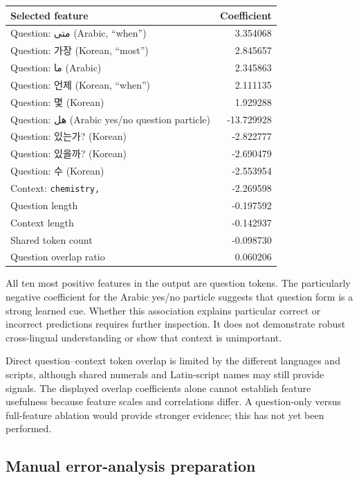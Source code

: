 \documentclass[11pt,a4paper]{article}
\newcommand{\AR}[1]{{\arabicfont\beginR #1\endR}}
\newcommand{\KO}[1]{{\koreanfont #1}}
\begin{document}
\begin{center}
\small
\begin{tabular}{lr}
\toprule
Selected feature & Coefficient \\
\midrule
Question: \AR{متى} (Arabic, ``when'') & 3.354068 \\
Question: \KO{가장} (Korean, ``most'') & 2.845657 \\
Question: \AR{ما} (Arabic) & 2.345863 \\
Question: \KO{언제} (Korean, ``when'') & 2.111135 \\
Question: \KO{몇} (Korean) & 1.929288 \\
Question: \AR{هل} (Arabic yes/no question particle) & -13.729928 \\
Question: \KO{있는가?} (Korean) & -2.822777 \\
Question: \KO{있을까?} (Korean) & -2.690479 \\
Question: \KO{수} (Korean) & -2.553954 \\
Context: \texttt{chemistry,} & -2.269598 \\
\midrule
Question length & -0.197592 \\
Context length & -0.142937 \\
Shared token count & -0.098730 \\
Question overlap ratio & 0.060206 \\
\bottomrule
\end{tabular}
\end{center}

All ten most positive features in the output are question tokens.
The particularly negative coefficient for the Arabic yes/no particle
suggests that question form is a strong learned cue. Whether this
association explains particular correct or incorrect predictions
requires further inspection. It does not demonstrate robust
cross-lingual understanding or show that context is unimportant.

Direct question--context token overlap is limited by the different
languages and scripts, although shared numerals and Latin-script names
may still provide signals. The displayed overlap coefficients alone
cannot establish feature usefulness because feature scales and
correlations differ. A question-only versus full-feature ablation
would provide stronger evidence; this has not yet been performed.


\subsection{Manual error-analysis preparation}
\end{document}
